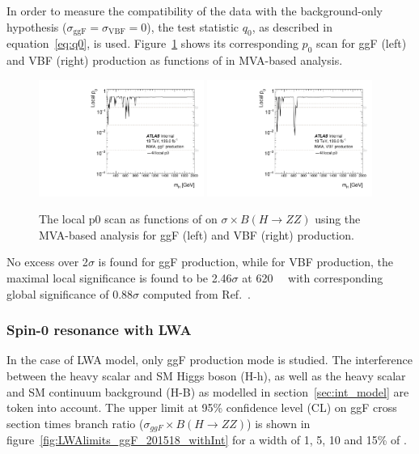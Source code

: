 In order to measure the compatibility of the data with the background-only hypothesis ($\sigma_{\mathrm{ggF}}=\sigma_{\mathrm{VBF}}=0$), the test statistic $q_{0}$, as described in equation~\ref{eq:q0}, is used.
Figure~\ref{fig:p0_MVA} shows its corresponding $p_0$ scan for ggF (left) and VBF (right) production as functions of \mH in MVA-based analysis.
\begin{figure}[h]
    \centering
    \includegraphics[width=0.48\textwidth]{figures/HMHZZ/results/p0_4ldnn_p0_ggF.pdf}
    \includegraphics[width=0.48\textwidth]{figures/HMHZZ/results/p0_4ldnn_p0_VBF.pdf}
    \caption{The local p0 scan as functions of \mH on $\sigma \times B(H \rightarrow ZZ)$ using the MVA-based analysis for ggF (left) and VBF (right) production.
 }
    \label{fig:p0_MVA}
\end{figure}
No excess over 2$\sigma$ is found for ggF production, while for VBF production, the maximal local significance is found to be 2.46$\sigma$ at 620~\gev~
with corresponding global significance of 0.88$\sigma$ computed from Ref.~\cite{Gross:2010qma}.

\subsubsection{Spin-0 resonance with LWA}

In the case of LWA model, only ggF production mode is studied.
The interference between the heavy scalar and SM Higgs boson (H-h), as well as the heavy scalar and SM \ggZZ continuum background (H-B) as modelled in section~\ref{sec:int_model} are token into account.
The upper limit at 95\% confidence level (CL) on ggF cross section times branch ratio ($\sigma_{ggF} \times B(H \rightarrow ZZ)$) is shown in figure~\ref{fig:LWAlimits_ggF_201518_withInt} for a width of 1, 5, 10 and 15\% of \mH.

